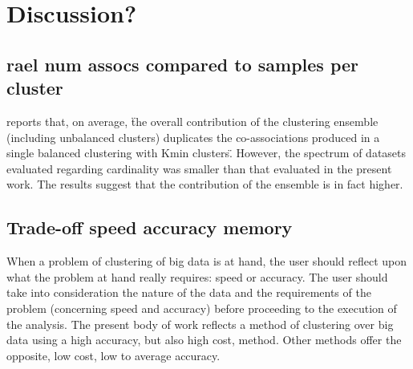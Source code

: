 \documentclass[10pt,a4paper,twoside]{report}
\begin{document}
\printglossary
\cleardoublepage

%
\setcounter{page}{1}









\chapter{Discussion?}
\label{chapter:discussion}

\section{rael num assocs compared to samples per cluster}

\cite{Lourenco2010} reports that, on average, \"the overall contribution of the clustering ensemble (including unbalanced clusters) duplicates the co-associations produced in a single balanced clustering with Kmin clusters\".
However, the spectrum of datasets evaluated regarding cardinality was smaller than that evaluated in the present work.
The results suggest that the contribution of the ensemble is in fact higher. %

\section{Trade-off speed accuracy memory}

When a problem of clustering of big data is at hand, the user should reflect upon what the problem at hand really requires: speed or accuracy. The user should take into consideration the nature of the data and the requirements of the problem (concerning speed and accuracy) before proceeding to the execution of the analysis. The present body of work reflects a method of clustering over big data using a high accuracy, but also high cost, method. Other methods offer the opposite, low cost, low to average accuracy. 
\end{document}
